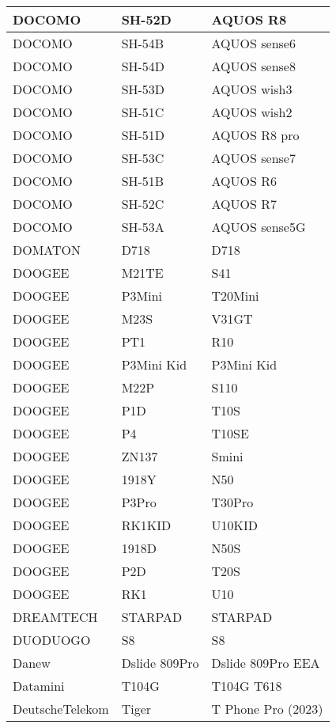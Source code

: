 \begin{tabularx}{\linewidth}{|l|X|X|}
        DOCOMO & SH-52D & AQUOS R8 \\ \hline
        DOCOMO & SH-54B & AQUOS sense6 \\ \hline
        DOCOMO & SH-54D & AQUOS sense8 \\ \hline
        DOCOMO & SH-53D & AQUOS wish3 \\ \hline
        DOCOMO & SH-51C & AQUOS wish2 \\ \hline
        DOCOMO & SH-51D & AQUOS R8 pro \\ \hline
        DOCOMO & SH-53C & AQUOS sense7 \\ \hline
        DOCOMO & SH-51B & AQUOS R6 \\ \hline
        DOCOMO & SH-52C & AQUOS R7 \\ \hline
        DOCOMO & SH-53A & AQUOS sense5G \\ \hline
        DOMATON & D718 & D718 \\ \hline
        DOOGEE & M21TE & S41 \\ \hline
        DOOGEE & P3Mini & T20Mini \\ \hline
        DOOGEE & M23S & V31GT \\ \hline
        DOOGEE & PT1 & R10 \\ \hline
        DOOGEE & P3Mini Kid & P3Mini Kid \\ \hline
        DOOGEE & M22P & S110 \\ \hline
        DOOGEE & P1D & T10S \\ \hline
        DOOGEE & P4 & T10SE \\ \hline
        DOOGEE & ZN137 & Smini \\ \hline
        DOOGEE & 1918Y & N50 \\ \hline
        DOOGEE & P3Pro & T30Pro \\ \hline
        DOOGEE & RK1KID & U10KID \\ \hline
        DOOGEE & 1918D & N50S \\ \hline
        DOOGEE & P2D & T20S \\ \hline
        DOOGEE & RK1 & U10 \\ \hline
        DREAMTECH & STARPAD & STARPAD \\ \hline
        DUODUOGO & S8 & S8 \\ \hline
        Danew & Dslide 809Pro & Dslide 809Pro EEA \\ \hline
        Datamini & T104G & T104G T618 \\ \hline
        DeutscheTelekom & Tiger & T Phone Pro (2023) \\ \hline

\end{tabularx}
